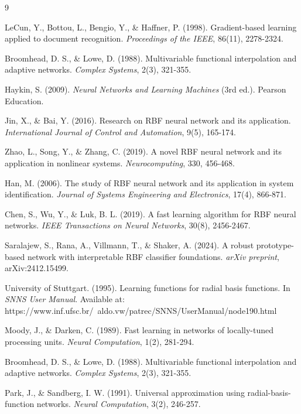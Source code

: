 \documentclass[12pt]{article}
\begin{document}
	
	\begin{thebibliography}{9}
		
		 LeCun, Y., Bottou, L., Bengio, Y., \& Haffner, P. (1998). Gradient-based learning applied to document recognition. \textit{Proceedings of the IEEE}, 86(11), 2278-2324.
		
		 Broomhead, D. S., \& Lowe, D. (1988). Multivariable functional interpolation and adaptive networks. \textit{Complex Systems}, 2(3), 321-355.
		
		 Haykin, S. (2009). \textit{Neural Networks and Learning Machines} (3rd ed.). Pearson Education.
		
		 Jin, X., \& Bai, Y. (2016). Research on RBF neural network and its application. \textit{International Journal of Control and Automation}, 9(5), 165-174.
		
		 Zhao, L., Song, Y., \& Zhang, C. (2019). A novel RBF neural network and its application in nonlinear systems. \textit{Neurocomputing}, 330, 456-468.
		
		 Han, M. (2006). The study of RBF neural network and its application in system identification. \textit{Journal of Systems Engineering and Electronics}, 17(4), 866-871.
		
		 Chen, S., Wu, Y., \& Luk, B. L. (2019). A fast learning algorithm for RBF neural networks. \textit{IEEE Transactions on Neural Networks}, 30(8), 2456-2467.
		
		 Saralajew, S., Rana, A., Villmann, T., \& Shaker, A. (2024). A robust prototype-based network with interpretable RBF classifier foundations. \textit{arXiv preprint}, arXiv:2412.15499.
		
		 University of Stuttgart. (1995). Learning functions for radial basis functions. In \textit{SNNS User Manual}. Available at: https://www.inf.ufsc.br/~aldo.vw/patrec/SNNS/UserManual/node190.html
		
		 Moody, J., \& Darken, C. (1989). Fast learning in networks of locally-tuned processing units. \textit{Neural Computation}, 1(2), 281-294.
		
		 Broomhead, D. S., \& Lowe, D. (1988). Multivariable functional interpolation and adaptive networks. \textit{Complex Systems}, 2(3), 321-355.
		
		 Park, J., \& Sandberg, I. W. (1991). Universal approximation using radial-basis-function networks. \textit{Neural Computation}, 3(2), 246-257.
		

\end{thebibliography}
\end{document}
